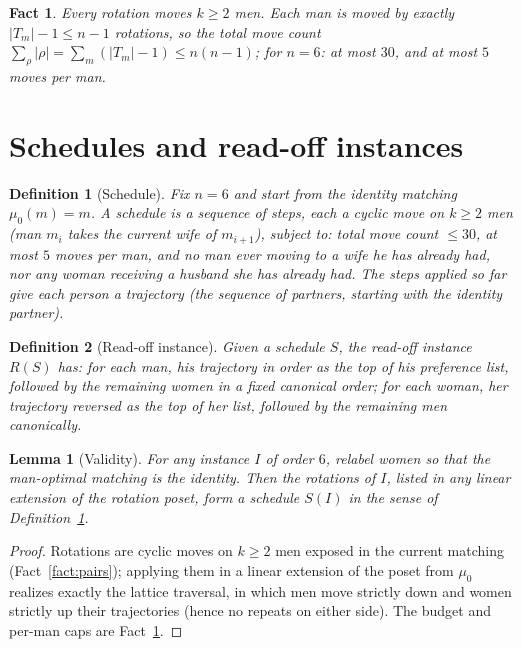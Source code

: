 \documentclass[11pt]{article}
\newtheorem{lemma}{Lemma}
\newtheorem{definition}{Definition}
\newtheorem{fact}{Fact}
\begin{document}
\begin{fact}\label{fact:budget}
Every rotation moves $k\ge 2$ men. Each man is moved by exactly $|T_m|-1\le n-1$
rotations, so the total move count $\sum_\rho |\rho| = \sum_m (|T_m|-1)\le n(n-1)$;
for $n=6$: at most $30$, and at most $5$ moves per man.
\end{fact}

\section{Schedules and read-off instances}

\begin{definition}[Schedule]\label{def:sched}
Fix $n=6$ and start from the identity matching $\mu_0(m)=m$. A \emph{schedule} is a
sequence of \emph{steps}, each a cyclic move on $k\ge 2$ men (man $m_i$ takes the
current wife of $m_{i+1}$), subject to: total move count $\le 30$, at most $5$ moves
per man, and no man ever moving to a wife he has already had, nor any woman receiving a
husband she has already had. The steps applied so far give each person a
\emph{trajectory} (the sequence of partners, starting with the identity partner).
\end{definition}

\begin{definition}[Read-off instance]\label{def:readoff}
Given a schedule $S$, the read-off instance $R(S)$ has: for each man, his trajectory in
order as the top of his preference list, followed by the remaining women in a fixed
canonical order; for each woman, her trajectory \emph{reversed} as the top of her list,
followed by the remaining men canonically.
\end{definition}

\begin{lemma}[Validity]\label{lem:valid}
For any instance $I$ of order $6$, relabel women so that the man-optimal matching is the
identity. Then the rotations of $I$, listed in any linear extension of the rotation
poset, form a schedule $S(I)$ in the sense of Definition~\ref{def:sched}.
\end{lemma}

\begin{proof}
Rotations are cyclic moves on $k\ge2$ men exposed in the current matching
(Fact~\ref{fact:pairs}); applying them in a linear extension of the poset from $\mu_0$
realizes exactly the lattice traversal, in which men move strictly down and women
strictly up their trajectories (hence no repeats on either side). The budget and
per-man caps are Fact~\ref{fact:budget}.
\end{proof}
\end{document}
